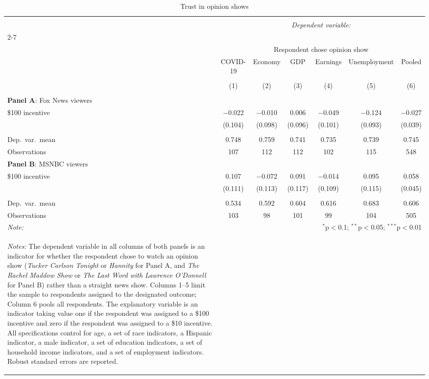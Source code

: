 \begin{table}[!htbp] \centering 
  \caption{Trust in opinion shows} 
  \label{t:trust-experiment} 
\begin{threeparttable}
\begin{tabular}{@{\extracolsep{5pt}}lcccccc} 
\\[-1.8ex]\hline 
\hline \\[-1.8ex] 
 & \multicolumn{6}{c}{\textit{Dependent variable:}} \\ 
\cline{2-7} 
\\[-1.8ex] & \multicolumn{6}{c}{Respondent chose opinion show} \\ 
 & COVID-19 & Economy & GDP & Earnings & Unemployment & Pooled \\ 
\\[-1.8ex] & (1) & (2) & (3) & (4) & (5) & (6)\\ 
\hline \\[-1.8ex] 
\multicolumn{7}{l}{\textbf{Panel A}: Fox News viewers} \\
\midrule
 \$100 incentive & $-$0.022 & $-$0.010 & 0.006 & $-$0.049 & $-$0.124 & $-$0.027 \\ 
  & (0.104) & (0.098) & (0.096) & (0.101) & (0.093) & (0.039) \\ 
  & & & & & & \\ 
Dep.~var.~mean & 0.748 & 0.759 & 0.741 & 0.735 & 0.739 & 0.745 \\ 
Observations & 107 & 112 & 112 & 102 & 115 & 548 \\ 
\midrule
\multicolumn{7}{l}{\textbf{Panel B}: MSNBC viewers} \\
\midrule
 \$100 incentive & 0.107 & $-$0.072 & 0.091 & $-$0.014 & 0.095 & 0.058 \\ 
  & (0.111) & (0.113) & (0.117) & (0.109) & (0.115) & (0.045) \\ 
  & & & & & & \\ 
Dep.~var.~mean & 0.534 & 0.592 & 0.604 & 0.616 & 0.683 & 0.606 \\ 
Observations & 103 & 98 & 101 & 99 & 104 & 505 \\ 
\hline 
\midrule
\textit{Note:}  & \multicolumn{6}{r}{$^{*}$p$<$0.1; $^{**}$p$<$0.05; $^{***}$p$<$0.01} \\ 
\begin{tablenotes} \small
\item \textit{Notes:} The dependent variable in all columns of both panels is an indicator for whether the respondent chose to watch an opinion show (\textit{Tucker Carlson Tonight} or \textit{Hannity} for Panel A, and \textit{The Rachel Maddow Show} or \textit{The Last Word with Lawrence O'Donnell} for Panel B) rather than a straight news show. Columns 1--5 limit the sample to respondents assigned to the designated outcome; Column 6 pools all respondents. The explanatory variable is an indicator taking value one if the respondent was assigned to a \$100 incentive and zero if the respondent was assigned to a \$10 incentive. All specifications control for age, a set of race indicators, a Hispanic indicator, a male indicator, a set of education indicators, a set of household income indicators, and a set of employment indicators. Robust standard errors are reported.

\end{tablenotes}
\end{tabular}
\end{threeparttable}
\end{table}
